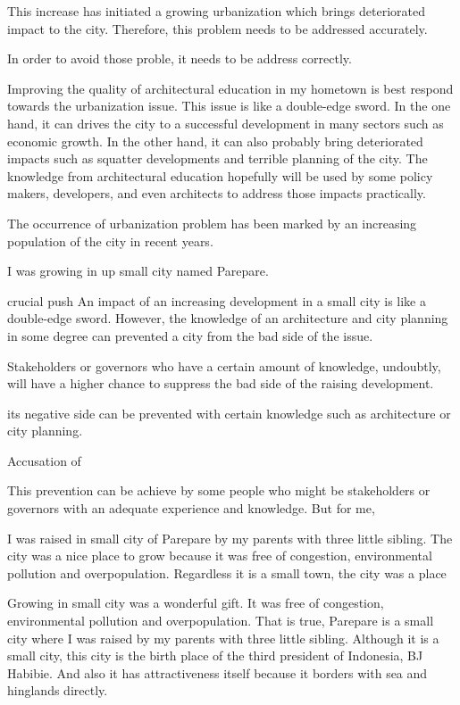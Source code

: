 \documentclass[11pt]{simart} %
\begin{document}
This increase has initiated a growing urbanization which brings deteriorated impact to the city. Therefore, this problem needs to be addressed accurately.

In order to avoid those proble, it needs to be address correctly.

Improving the quality of architectural education in my hometown is best respond towards the urbanization issue.
This issue is like a double-edge sword. In the one hand, it can drives the city to a successful development in many sectors such as economic growth. In the other hand, it can also probably bring deteriorated impacts such as squatter developments and terrible planning of the city. The knowledge from architectural education hopefully will be used by some policy makers, developers, and even architects to address those impacts practically.


The occurrence of urbanization problem has been marked by an increasing population of the city in recent years.

I was growing in up small city named Parepare.

crucial
push
An impact of an increasing development in a small city is like a double-edge sword.
However, the knowledge of an architecture and city planning in some degree can prevented a city from the bad side of the issue.

Stakeholders or governors who have a certain amount of knowledge, undoubtly, will have a higher chance to suppress the bad side of the raising development.

its negative side can be prevented with certain knowledge such as architecture or city planning.

Accusation of

This prevention can be achieve by some people who might be stakeholders or governors with an adequate experience and knowledge. But for me,

I was raised in small city of Parepare by my parents with three little sibling. The city was a nice place to grow because it was free of congestion, environmental pollution and overpopulation. Regardless it is a small town, the city was a place

Growing in small city was a wonderful gift. It was free of congestion, environmental pollution and overpopulation. That is true, Parepare is a small city where I was raised by my parents with three little sibling. Although it is a small city, this city is the birth place of the third president of Indonesia, BJ Habibie. And also it has attractiveness itself because it borders with sea and hinglands directly.
\end{document}
